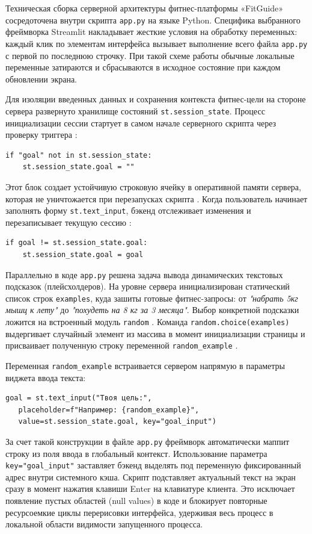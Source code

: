 \documentclass[14pt, a4paper]{extarticle}
\begin{document}
Техническая сборка серверной архитектуры фитнес-платформы «FitGuide» сосредоточена внутри скрипта \texttt{app.py} на языке Python. Специфика выбранного фреймворка Streamlit накладывает жесткие условия на обработку переменных: каждый клик по элементам интерфейса вызывает выполнение всего файла \texttt{app.py} с первой по последнюю строчку. При такой схеме работы обычные локальные переменные затираются и сбрасываются в исходное состояние при каждом обновлении экрана.

Для изоляции введенных данных и сохранения контекста фитнес-цели на стороне сервера развернуто хранилище состояний \texttt{st.session\_state}. Процесс инициализации сессии стартует в самом начале серверного скрипта через проверку триггера \cite{app.py}:
\begin{verbatim}
if "goal" not in st.session_state:
    st.session_state.goal = ""
\end{verbatim}

Этот блок создает устойчивую строковую ячейку в оперативной памяти сервера, которая не уничтожается при перезапусках скрипта \cite{app.py}. Когда пользователь начинает заполнять форму \texttt{st.text\_input}, бэкенд отслеживает изменения и перезаписывает текущую сессию \cite{app.py}:
\begin{verbatim}
if goal != st.session_state.goal:
    st.session_state.goal = goal
\end{verbatim}

Параллельно в коде \texttt{app.py} решена задача вывода динамических текстовых подсказок (плейсхолдеров). На уровне сервера инициализирован статический список строк \texttt{examples}, куда зашиты готовые фитнес-запросы: от \textit{"набрать 5кг мышц к лету"} до \textit{"похудеть на 8 кг за 3 месяца"}. Выбор конкретной подсказки ложится на встроенный модуль \texttt{random} \cite{app.py}. Команда \texttt{random.choice(examples)} выдергивает случайный элемент из массива в момент инициализации страницы и присваивает полученную строку переменной \texttt{random\_example} \cite{app.py}.

Переменная \texttt{random\_example} встраивается сервером напрямую в параметры виджета ввода текста:
\begin{verbatim}
goal = st.text_input("Твоя цель:", 
   placeholder=f"Например: {random_example}",
   value=st.session_state.goal, key="goal_input")
\end{verbatim}

За счет такой конструкции в файле \texttt{app.py} фреймворк автоматически маппит строку из поля ввода в глобальный контекст. Использование параметра \texttt{key="goal\_input"} заставляет бэкенд выделять под переменную фиксированный адрес внутри системного кэша. Скрипт подставляет актуальный текст на экран сразу в момент нажатия клавиши Enter на клавиатуре клиента. Это исключает появление пустых областей (null values) в коде и блокирует повторные ресурсоемкие циклы перерисовки интерфейса, удерживая весь процесс в локальной области видимости запущенного процесса.
\end{document}
